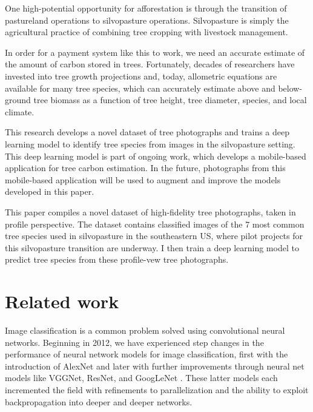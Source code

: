 \documentclass[10pt,twocolumn,letterpaper]{article}
\begin{document}
One high-potential opportunity for afforestation is through the transition of pastureland operations to silvopasture operations. Silvopasture is simply the agricultural practice of combining tree cropping with livestock management. 

In order for a payment system like this to work, we need an accurate estimate of the amount of carbon stored in trees. Fortunately, decades of researchers have invested into tree growth projections and, today, allometric equations are available for many tree species, which can accurately estimate above and below-ground tree biomass as a function of tree height, tree diameter, species, and local climate. 

This research develops a novel dataset of tree photographs and trains a deep learning model to identify tree species from images in the silvopasture setting. This deep learning model is part of ongoing work, which develops a mobile-based application for tree carbon estimation.   %
In the future, photographs from this mobile-based application will be used to augment and improve the models developed in this paper.

This paper compiles a novel dataset of high-fidelity tree photographs, taken in profile perspective. The dataset contains classified images of the 7 most common tree species used in silvopasture in the southeastern US, where pilot projects for this silvopasture transition are underway. I then train a deep learning model to predict tree species from these profile-vew tree photographs.

\section{Related work}
\label{sec:litreview}

Image classification is a common problem solved using convolutional neural networks. Beginning in 2012, we have experienced step changes in the performance of neural network models for image classification, first with the introduction of AlexNet and later with further improvements through neural net models like VGGNet, ResNet, and GoogLeNet \cite{VGGNet, GoogLeNET, ResNET}. These latter models each incremented the field with refinements to parallelization and the ability to exploit backpropagation into deeper and deeper networks.
\end{document}
